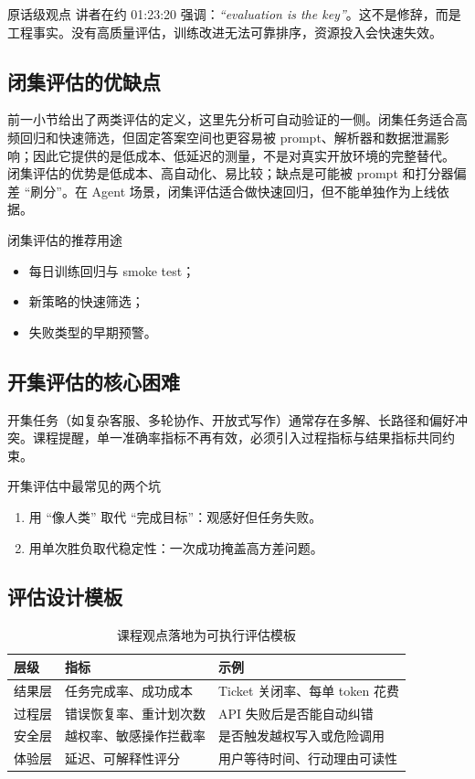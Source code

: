 \documentclass[a4paper]{article}
\begin{document}
\begin{importantbox}{原话级观点}
讲者在约 01:23:20 强调：\textit{``evaluation is the key''}。这不是修辞，而是工程事实。没有高质量评估，训练改进无法可靠排序，资源投入会快速失效。
\end{importantbox}

\subsection{闭集评估的优缺点}
前一小节给出了两类评估的定义，这里先分析可自动验证的一侧。闭集任务适合高频回归和快速筛选，但固定答案空间也更容易被 prompt、解析器和数据泄漏影响；因此它提供的是低成本、低延迟的测量，不是对真实开放环境的完整替代。
闭集评估的优势是低成本、高自动化、易比较；缺点是可能被 prompt 和打分器偏差 ``刷分''。在 Agent 场景，闭集评估适合做快速回归，但不能单独作为上线依据。

\begin{knowledgebox}{闭集评估的推荐用途}
\begin{itemize}
    \item 每日训练回归与 smoke test；
    \item 新策略的快速筛选；
    \item 失败类型的早期预警。
\end{itemize}
\end{knowledgebox}

\subsection{开集评估的核心困难}
开集任务（如复杂客服、多轮协作、开放式写作）通常存在多解、长路径和偏好冲突。课程提醒，单一准确率指标不再有效，必须引入过程指标与结果指标共同约束。

\begin{warningbox}{开集评估中最常见的两个坑}
\begin{enumerate}
    \item 用 ``像人类'' 取代 ``完成目标''：观感好但任务失败。
    \item 用单次胜负取代稳定性：一次成功掩盖高方差问题。
\end{enumerate}
\end{warningbox}

\subsection{评估设计模板}
\begin{table}[H]
\centering
\begin{tabular}{p{3.0cm}p{4.0cm}p{4.8cm}}
\toprule
\textbf{层级} & \textbf{指标} & \textbf{示例} \\
\midrule
结果层 & 任务完成率、成功成本 & Ticket 关闭率、每单 token 花费 \\
过程层 & 错误恢复率、重计划次数 & API 失败后是否能自动纠错 \\
安全层 & 越权率、敏感操作拦截率 & 是否触发越权写入或危险调用 \\
体验层 & 延迟、可解释性评分 & 用户等待时间、行动理由可读性 \\
\bottomrule
\end{tabular}
\caption{课程观点落地为可执行评估模板}
\end{table}
\end{document}
